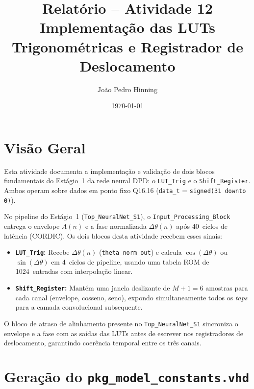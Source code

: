 \documentclass[a4paper,12pt]{article}
\title{Relat\'orio -- Atividade 12 \\
       \large Implementa\c{c}\~ao das LUTs Trigonom\'etricas e Registrador de Deslocamento}
\author{Jo\~ao Pedro Hinning}
\date{\today}
\begin{document}
\maketitle
\thispagestyle{fancy}

\section{Vis\~ao Geral}

Esta atividade documenta a implementa\c{c}\~ao e valida\c{c}\~ao de dois blocos fundamentais
do Est\'agio~1 da rede neural DPD: o \texttt{LUT\_Trig} e o \texttt{Shift\_Register}.
Ambos operam sobre dados em ponto fixo Q16.16 (\texttt{data\_t} = \texttt{signed(31 downto 0)}).

No pipeline do Est\'agio~1 (\texttt{Top\_NeuralNet\_S1}), o \texttt{Input\_Processing\_Block}
entrega o envelope $A(n)$ e a fase normalizada $\Delta\theta(n)$ ap\'os 40~ciclos de lat\^encia
(CORDIC). Os dois blocos desta atividade recebem esses sinais:

\begin{itemize}
    \item \textbf{\texttt{LUT\_Trig}:} Recebe $\Delta\theta(n)$ (\texttt{theta\_norm\_out}) e
          calcula $\cos(\Delta\theta)$ ou $\sin(\Delta\theta)$ em 4~ciclos de pipeline, usando
          uma tabela ROM de 1024~entradas com interpola\c{c}\~ao linear.
    \item \textbf{\texttt{Shift\_Register}:} Mant\'em uma janela deslizante de $M+1 = 6$
          amostras para cada canal (envelope, cosseno, seno), expondo simultaneamente todos os
          \textit{taps} para a camada convolucional subsequente.
\end{itemize}

O bloco de atraso de alinhamento presente no \texttt{Top\_NeuralNet\_S1} sincroniza o envelope
e a fase com as sa\'idas das LUTs antes de escrever nos registradores de deslocamento, garantindo
coer\^encia temporal entre os tr\^es canais.


\section{Gera\c{c}\~ao do \texttt{pkg\_model\_constants.vhd}}
\end{document}
